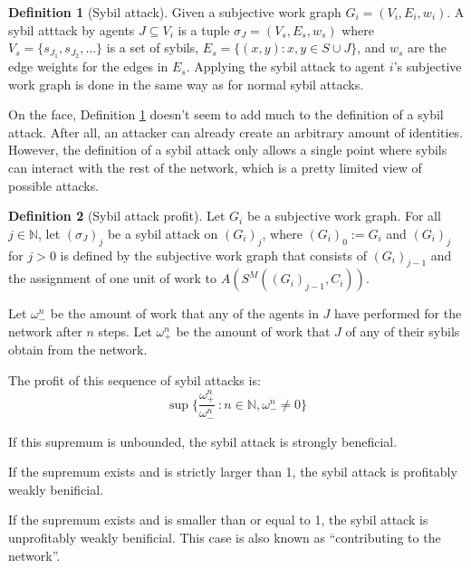 \documentclass[a4paper,11pt]{book}
\newcommand{\bb}{\mathbb}
\theoremstyle{definition}
\newtheorem{definition}{Definition}
\begin{document}
\begin{definition}[Sybil attack]
    Given a subjective work graph $G_i = (V_i, E_i, w_i)$.
    A sybil atttack by agents $J \subseteq V_i$ is a tuple $\sigma_J = (V_s, E_s, w_s)$
    where $V_s = \{ s_{J_1}, s_{J_2}, \ldots\}$ is a set of sybils, 
    $E_s = \{(x, y) : x, y \in S \cup J\}$, and $w_s$ are the edge weights for
    the edges in $E_s$. Applying the sybil attack to agent $i$'s subjective work graph
    is done in the same way as for normal sybil attacks.
    \label{def:collsybil}
\end{definition}

On the face, Definition \ref{def:collsybil} doesn't seem to add much to the definition of a sybil attack.
After all, an attacker can already create an arbitrary amount of identities. However, the definition of a
sybil attack only allows a single point where sybils can interact with the rest of the network, which is a pretty limited
view of possible attacks. 

\begin{definition}[Sybil attack profit]
    Let $G_i$ be a subjective work graph. For all $j \in \bb{N}$, let $(\sigma_J)_j$ be a sybil attack
    on $(G_i)_j$, where $(G_i)_0 := G_i$ and $(G_i)_j$ for $j > 0$ is defined by the subjective
    work graph that consists of $(G_i)_{j-1}$ and the assignment of one unit of work to 
    $A(S^M( (G_i)_{j-1}, C_i))$.

    Let $\omega^n_-$ be the amount of work that any of the agents in $J$ have performed for
    the network after $n$ steps. Let $\omega^n_+$ be the amount of work that $J$ of any of their
    sybils obtain from the network.

    The profit of this sequence of sybil attacks is:
    \begin{equation*}
        \sup \{\frac{\omega^n_+}{\omega^n_-}\ : n \in \bb{N}, \omega^n_- \neq 0\}
    \end{equation*}

    If this supremum is unbounded, the sybil attack is strongly beneficial.

    If the supremum exists and is strictly larger than 1, the sybil attack is 
    profitably weakly benificial.

    If the supremum exists and is smaller than or equal to 1, the sybil attack
    is unprofitably weakly benificial. This case is also known as ``contributing to the network''.
    \label{def:sybil_profit}
\end{definition}
\end{document}

